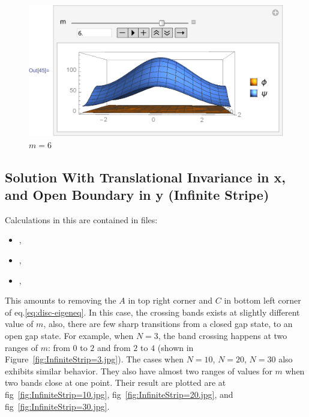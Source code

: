 \documentclass{article}
\begin{document}
    \begin{figure}[H]
        \centering
        \includegraphics[width=0.6\linewidth]{pics/OpenBC-inXY/Eigen-m6.pdf}
        \caption{$m=6$}
    \end{figure}

\subsection{Solution With Translational Invariance in x, and Open
Boundary in y (Infinite Stripe)}

Calculations in this are contained in files: 
\begin{itemize}
    \item {},
    \item {},
    \item {},
\end{itemize}

This amounts to removing the $A$ in top right corner and $C$ in bottom left
corner of eq.\ref{eq:disc-eigeneq}.  In this case, the crossing bands exists at
slightly different value of $m$, also, there are few sharp transitions from a
closed gap state, to an open gap state. For example, when $N=3$, the band
crossing happens at two ranges of $m$: from $0$ to $2$ and from $2$ to $4$
(shown in Figure~\ref{fig:InfiniteStrip=3.jpg}). The cases when $N=10$, $N=20$,
$N=30$ also exhibits similar behavior. They also have almost two ranges of
values for $m$ when two bands close at one point. Their result are plotted are
at fig~\ref{fig:InfiniteStrip=10.jpg}, fig~\ref{fig:InfiniteStrip=20.jpg}, and
fig~\ref{fig:InfiniteStrip=30.jpg}.
\end{document}

